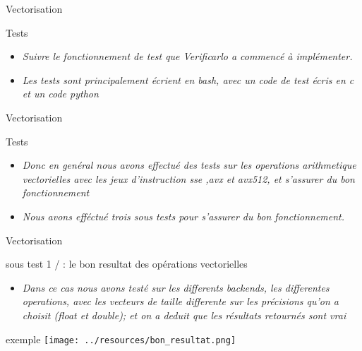\documentclass{beamer}
\begin{document}
\begin{frame}{Vectorisation}
\begin{block}{Tests}
    \begin{itemize}
        \item\textit{ Suivre le fonctionnement de test que
Verificarlo a commencé à implémenter. } 
         \item \textit{Les tests sont principalement écrient en bash, avec un code de test écris en c et un code python}  
          
         \end{itemize}  
\end{block}
\end{frame}


\begin{frame}{Vectorisation}
\begin{block}{Tests}
      \begin{itemize}
        \item\textit{Donc en genéral nous avons effectué des tests sur les operations arithmetique vectorielles avec les jeux d'instruction sse ,avx et avx512, et s'assurer du bon fonctionnement } 
         
        \item \textit{Nous avons efféctué trois sous tests pour s'assurer du bon fonctionnement.}   
         
         \end{itemize}
\end{block}
\end{frame}


\begin{frame}{Vectorisation} 
\begin{block}{sous test 1 / : le bon resultat des opérations vectorielles}
 \begin{itemize}
        \item\textit{Dans ce cas nous avons testé sur les differents backends, les differentes operations, avec les vecteurs de taille differente sur les précisions qu'on a choisit (float et double);
        et on a deduit que les résultats retournés sont vrai
        } 
        \end{itemize}   
\end{block}
\begin{block}{exemple}
 \centering\texttt{[image: ../resources/bon\_resultat.png]}
\end{block}
\end{frame}
\end{document}
